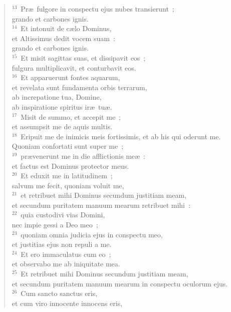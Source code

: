 \begin{flushleft}
\begin{verse}
${}^{13}$~Pr\ae\ fulgore in conspectu ejus nubes transierunt~;\\ grando et carbones ignis.\\
${}^{14}$~Et intonuit de c\ae lo Dominus,\\ et Altissimus dedit vocem suam~:\\ grando et carbones ignis.\\
${}^{15}$~Et misit sagittas suas, et dissipavit eos~;\\ fulgura multiplicavit, et conturbavit eos.\\
${}^{16}$~Et apparuerunt fontes aquarum,\\ et revelata sunt fundamenta orbis terrarum,\\ ab increpatione tua, Domine,\\ ab inspiratione spiritus ir\ae\ tu\ae .\\
${}^{17}$~Misit de summo, et accepit me~;\\ et assumpsit me de aquis multis.\\
${}^{18}$~Eripuit me de inimicis meis fortissimis, et ab his qui oderunt me.\\ Quoniam confortati sunt super me~;\\
${}^{19}$~pr\ae venerunt me in die afflictionis me\ae~:\\ et factus est Dominus protector meus.\\
${}^{20}$~Et eduxit me in latitudinem~;\\ salvum me fecit, quoniam voluit me,\\
${}^{21}$~et retribuet mihi Dominus secundum justitiam meam,\\ et secundum puritatem manuum mearum retribuet mihi~:\\
${}^{22}$~quia custodivi vias Domini,\\ nec impie gessi a Deo meo~;\\
${}^{23}$~quoniam omnia judicia ejus in conspectu meo,\\ et justitias ejus non repuli a me.\\
${}^{24}$~Et ero immaculatus cum eo~;\\ et observabo me ab iniquitate mea.\\
${}^{25}$~Et retribuet mihi Dominus secundum justitiam meam,\\ et secundum puritatem manuum mearum in conspectu oculorum ejus.\\
${}^{26}$~Cum sancto sanctus eris,\\ et cum viro innocente innocens eris,\\

\end{verse}
\end{flushleft}
